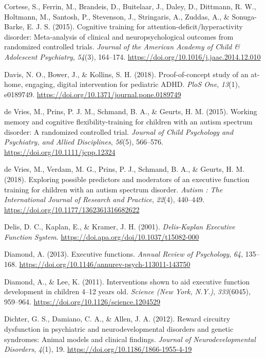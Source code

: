 \documentclass[
  letterpaper,
]{ut-thesis}
\newlength{\cslhangindent}
\newenvironment{CSLReferences}[2] %
 {\begin{list}{}{%
  \setlength{\itemindent}{0pt}
  \setlength{\leftmargin}{0pt}
  \setlength{\parsep}{0pt}
  \ifodd #1
   \setlength{\leftmargin}{\cslhangindent}
   \setlength{\itemindent}{-1\cslhangindent}
  \fi
  \setlength{\itemsep}{#2\baselineskip}}}
 {\end{list}}
\begin{document}
\begin{CSLReferences}{1}{0}
Cortese, S., Ferrin, M., Brandeis, D., Buitelaar, J., Daley, D.,
Dittmann, R. W., Holtmann, M., Santosh, P., Stevenson, J., Stringaris,
A., Zuddas, A., \& Sonuga-Barke, E. J. S. (2015). Cognitive training for
attention-deficit/hyperactivity disorder: {Meta-analysis} of clinical
and neuropsychological outcomes from randomized controlled trials.
\emph{Journal of the American Academy of Child \& Adolescent
Psychiatry}, \emph{54}(3), 164--174.
\url{https://doi.org/10.1016/j.jaac.2014.12.010}

Davis, N. O., Bower, J., \& Kollins, S. H. (2018). Proof-of-concept
study of an at-home, engaging, digital intervention for pediatric
{ADHD}. \emph{PloS One}, \emph{13}(1), e0189749.
\url{https://doi.org/10.1371/journal.pone.0189749}

de Vries, M., Prins, P. J. M., Schmand, B. A., \& Geurts, H. M. (2015).
Working memory and cognitive flexibility-training for children with an
autism spectrum disorder: A randomized controlled trial. \emph{Journal
of Child Psychology and Psychiatry, and Allied Disciplines},
\emph{56}(5), 566--576. \url{https://doi.org/10.1111/jcpp.12324}

de Vries, M., Verdam, M. G., Prins, P. J., Schmand, B. A., \& Geurts, H.
M. (2018). Exploring possible predictors and moderators of an executive
function training for children with an autism spectrum disorder.
\emph{Autism : The International Journal of Research and Practice},
\emph{22}(4), 440--449. \url{https://doi.org/10.1177/1362361316682622}

Delis, D. C., Kaplan, E., \& Kramer, J. H. (2001). \emph{Delis-{Kaplan
Executive Function System}}.
\url{https://doi.apa.org/doi/10.1037/t15082-000}

Diamond, A. (2013). Executive functions. \emph{Annual Review of
Psychology}, \emph{64}, 135--168.
\url{https://doi.org/10.1146/annurev-psych-113011-143750}

Diamond, A., \& Lee, K. (2011). Interventions shown to aid executive
function development in children 4--12 years old. \emph{Science (New
York, N.Y.)}, \emph{333}(6045), 959--964.
\url{https://doi.org/10.1126/science.1204529}

Dichter, G. S., Damiano, C. A., \& Allen, J. A. (2012). Reward circuitry
dysfunction in psychiatric and neurodevelopmental disorders and genetic
syndromes: Animal models and clinical findings. \emph{Journal of
Neurodevelopmental Disorders}, \emph{4}(1), 19.
\url{https://doi.org/10.1186/1866-1955-4-19}


\end{CSLReferences}
\end{document}
